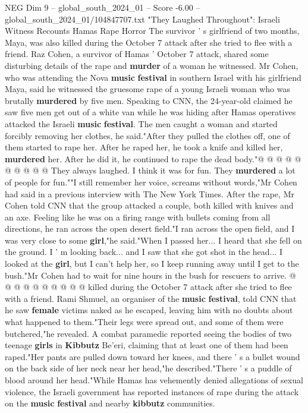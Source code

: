 \begin{textsample}{NEG Dim 9 – global\_south\_2024\_01 – Score -6.00 – global\_south\_2024\_01/104847707.txt}  \label{ex:f9_neg_423}
"They Laughed Throughout": Israeli Witness Recounts Hamas Rape Horror The survivor ' s girlfriend of two months, Maya, was also killed during the October 7 attack after she tried to flee with a friend.
Raz Cohen, a survivor of Hamas ' October 7 attack, shared some disturbing details of the rape and \textbf{murder} of a woman he witnessed.
Mr Cohen, who was attending the Nova \textbf{music} \textbf{festival} in southern Israel with his girlfriend Maya, said he witnessed the gruesome rape of a young Israeli woman who was brutally \textbf{murdered} by five men.
Speaking to CNN, the 24-year-old claimed he saw five men get out of a white van while he was hiding after Hamas operatives attacked the Israeli \textbf{music} \textbf{festival}.
The men caught a woman and started forcibly removing her clothes, he said."After they pulled the clothes off, one of them started to rape her.
After he raped her, he took a knife and killed her, \textbf{murdered} her.
After he did it, he continued to rape the dead body."@ @ @ @ @ @ @ @ @ @ They always laughed.
I think it was for fun.
They \textbf{murdered} a lot of people for fun.""I still remember her voice, screams without words,"Mr Cohen had said in a previous interview with The New York Times.
After the rape, Mr Cohen told CNN that the group attacked a couple, both killed with knives and an axe.
Feeling like he was on a firing range with bullets coming from all directions, he ran across the open desert field."I ran across the open field, and I was very close to some \textbf{girl},"he said."When I passed her...
I heard that she fell on the ground.
I ' m looking back... and I saw that she got shot in the head...
I looked at the \textbf{girl}, but I can't help her, so I keep running away until I get to the bush."Mr Cohen had to wait for nine hours in the bush for rescuers to arrive. @ @ @ @ @ @ @ @ @ @ killed during the October 7 attack after she tried to flee with a friend.
Rami Shmuel, an organiser of the \textbf{music} \textbf{festival}, told CNN that he saw \textbf{female} victims naked as he escaped, leaving him with no doubts about what happened to them."Their legs were spread out, and some of them were butchered,"he revealed.
A combat paramedic reported seeing the bodies of two teenage \textbf{girls} in \textbf{Kibbutz} Be'eri, claiming that at least one of them had been raped."Her pants are pulled down toward her knees, and there ' s a bullet wound on the back side of her neck near her head,"he described."There ' s a puddle of blood around her head."While Hamas has vehemently denied allegations of sexual violence, the Israeli government has reported instances of rape during the attack on the \textbf{music} \textbf{festival} and nearby \textbf{kibbutz} communities.

\end{textsample}
